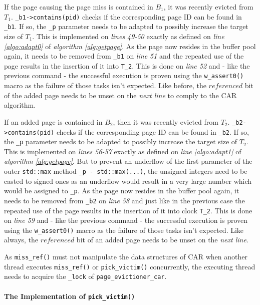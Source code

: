     If the page causing the page miss is contained in $B_1$, it was recently evicted from $T_1$. \lstinline{_b1->contains(pid)} checks if the corresponding page ID can be found in \lstinline{_b1}. If so, the \lstinline{_p} parameter needs to be adapted to possibly increase the target size of $T_1$. This is implemented on \emph{lines 49-50} exactly as defined on \emph{line \ref{algo:adapt0}} of \emph{algorithm \ref{alg:getpage}}. As the page now resides in the buffer pool again, it needs to be removed from \lstinline{_b1} on \emph{line 51} and the repeated use of the page results in the insertion of it into \lstinline{T_2}. This is done on \emph{line 52} and - like the previous command - the successful execution is proven using the \lstinline{w_assert0()} macro as the failure of those tasks isn't expected. Like before, the $referenced$ bit of the added page needs to be unset on the \emph{next line} to comply to the CAR algorithm.

    If an added page is contained in $B_2$, then it was recently evicted from $T_2$. \lstinline{_b2->contains(pid)} checks if the corresponding page ID can be found in \lstinline{_b2}. If so, the \lstinline{_p} parameter needs to be adapted to possibly increase the target size of $T_2$. This is implemented on \emph{lines 56-57} exactly as defined on \emph{line \ref{algo:adapt1}} of \emph{algorithm \ref{alg:getpage}}. But to prevent an underflow of the first parameter of the outer \lstinline{std::max} method \lstinline{_p - std::max(...)}, the unsigned integers need to be casted to signed ones as an underflow would result in a very large number which would be assigned to \lstinline{_p}. As the page now resides in the buffer pool again, it needs to be removed from \lstinline{_b2} on \emph{line 58} and just like in the previous case the repeated use of the page results in the insertion of it into clock \lstinline{T_2}. This is done on \emph{line 59} and - like the previous command - the successful execution is proven using the \lstinline{w_assert0()} macro as the failure of those tasks isn't expected. Like always, the $referenced$ bit of an added page needs to be unset on the \emph{next line}.

    As \lstinline{miss_ref()} must not manipulate the data structures of CAR when another thread executes \lstinline{miss_ref()} or \lstinline{pick_victim()} concurrently, the executing thread needs to acquire the \lstinline{_lock} of \lstinline{page_evictioner_car}.

\paragraph{The Implementation of \lstinline{pick_victim()}}

